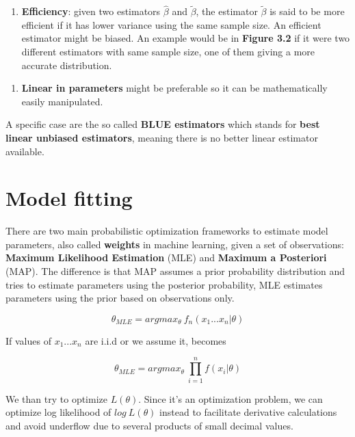 \begin{enumerate}
    \item \textbf{Efficiency}: given two estimators \(\hat \beta\) and \(\widetilde \beta\), the estimator \(\widetilde \beta\) is said to be more efficient if it has lower variance using the same sample size. An efficient estimator might be biased. An example would be in \textbf{Figure 3.2} if it were two different estimators with same sample size, one of them giving a more accurate distribution.
\end{enumerate}

\begin{enumerate}
    \item \textbf{Linear in parameters} might be preferable so it can be mathematically easily manipulated.
\end{enumerate}

A specific case are the so called \textbf{BLUE estimators} which stands for \textbf{best linear unbiased estimators}, meaning there is no better linear estimator available.

\section{Model fitting}

There are two main probabilistic optimization frameworks to estimate model parameters, also called \textbf{weights} in machine learning, given a set of observations: \textbf{Maximum Likelihood Estimation} (MLE) and \textbf{Maximum a Posteriori} (MAP). The difference is that MAP assumes a prior probability distribution and tries to estimate parameters using the posterior probability, MLE estimates parameters using the prior based on observations only.

\[\theta_{MLE} = argmax_{\theta}\ f_n(x_1...x_n|\theta)\]

If values of \(x_1...x_n\) are i.i.d or we assume it, becomes

\[\theta_{MLE} = argmax_{\theta}\ \prod_{i=1}^nf(x_i|\theta)\]

We than try to optimize \(L(\theta)\). Since it's an optimization problem, we can optimize log likelihood of \(log\ L(\theta)\) instead to facilitate derivative calculations and avoid underflow due to several products of small decimal values.

